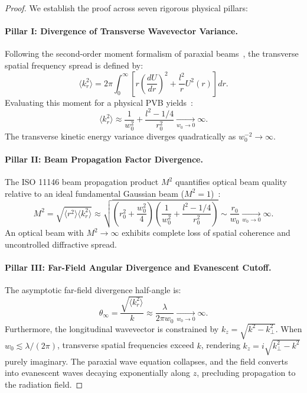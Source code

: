 \documentclass{optica-article}
\begin{document}
\begin{proof}
We establish the proof across seven rigorous physical pillars:

\paragraph{Pillar I: Divergence of Transverse Wavevector Variance.}
Following the second-order moment formalism of paraxial beams~\cite{Ferreira2026}, the transverse spatial frequency spread is defined by:
\begin{equation}
\langle k_r^2 \rangle = 2\pi \int_0^\infty \left[ r \left( \frac{dU}{dr} \right)^2 + \frac{l^2}{r} U^2(r) \right] dr.
\end{equation}
Evaluating this moment for a physical PVB yields~\cite{Ferreira2026}:
\begin{equation}
\langle k_r^2 \rangle \approx \frac{1}{w_0^2} + \frac{l^2 - 1/4}{r_0^2} \xrightarrow[w_0 \to 0]{} \infty.
\end{equation}
The transverse kinetic energy variance diverges quadratically as $w_0^{-2} \to \infty$.

\paragraph{Pillar II: Beam Propagation Factor Divergence.}
The ISO 11146 beam propagation product $M^2$ quantifies optical beam quality relative to an ideal fundamental Gaussian beam ($M^2 = 1$)~\cite{ISO11146,Siegman1986}:
\begin{equation}
M^2 = \sqrt{\langle r^2 \rangle \langle k_r^2 \rangle} \approx \sqrt{\left( r_0^2 + \frac{w_0^2}{4} \right) \left( \frac{1}{w_0^2} + \frac{l^2 - 1/4}{r_0^2} \right)} \sim \frac{r_0}{w_0} \xrightarrow[w_0 \to 0]{} \infty.
\end{equation}
An optical beam with $M^2 \to \infty$ exhibits complete loss of spatial coherence and uncontrolled diffractive spread.

\paragraph{Pillar III: Far-Field Angular Divergence and Evanescent Cutoff.}
The asymptotic far-field divergence half-angle is:
\begin{equation}
\theta_\infty = \frac{\sqrt{\langle k_r^2 \rangle}}{k} \approx \frac{\lambda}{2\pi w_0} \xrightarrow[w_0 \to 0]{} \infty.
\end{equation}
Furthermore, the longitudinal wavevector is constrained by $k_z = \sqrt{k^2 - k_\perp^2}$. When $w_0 \lesssim \lambda / (2\pi)$, transverse spatial frequencies exceed $k$, rendering $k_z = i \sqrt{k_\perp^2 - k^2}$ purely imaginary. The paraxial wave equation collapses, and the field converts into evanescent waves decaying exponentially along $z$, precluding propagation to the radiation field.


\end{proof}
\end{document}
